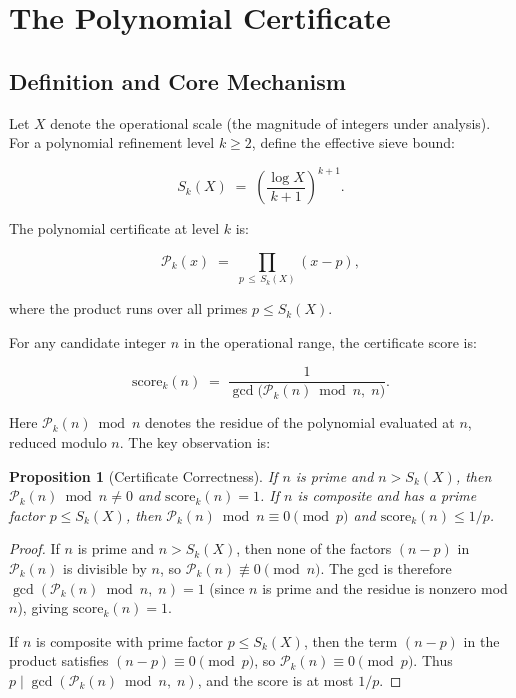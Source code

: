 \documentclass[11pt]{article}
\newtheorem{proposition}{Proposition}
\begin{document}
\section{The Polynomial Certificate}
\label{sec:score}

\subsection{Definition and Core Mechanism}

Let $X$ denote the operational scale (the magnitude of integers under analysis).
For a polynomial refinement level $k \ge 2$, define the effective sieve bound:

\begin{equation}
S_k(X) \;=\; \left(\frac{\log X}{k+1}\right)^{\!k+1}.
\end{equation}

\noindent The polynomial certificate at level $k$ is:

\begin{equation}
\mathcal{P}_k(x) \;=\; \prod_{p \,\le\, S_k(X)} (x - p),
\end{equation}

\noindent where the product runs over all primes $p \le S_k(X)$.

For any candidate integer $n$ in the operational range, the certificate score is:

\begin{equation}
\mathrm{score}_k(n) \;=\; \frac{1}{\gcd\!\bigl(\mathcal{P}_k(n)\bmod n,\; n\bigr)}.
\label{eq:score}
\end{equation}

\noindent Here $\mathcal{P}_k(n)\bmod n$ denotes the residue of the polynomial
evaluated at $n$, reduced modulo $n$. The key observation is:

\begin{proposition}[Certificate Correctness]
\label{prop:correctness}
If $n$ is prime and $n > S_k(X)$, then $\mathcal{P}_k(n)\bmod n \neq 0$ and
$\mathrm{score}_k(n) = 1$. If $n$ is composite and has a prime factor
$p \le S_k(X)$, then $\mathcal{P}_k(n)\bmod n \equiv 0 \pmod p$ and
$\mathrm{score}_k(n) \le 1/p$.
\end{proposition}

\begin{proof}
If $n$ is prime and $n > S_k(X)$, then none of the factors $(n-p)$ in
$\mathcal{P}_k(n)$ is divisible by $n$, so $\mathcal{P}_k(n)\not\equiv 0\pmod n$.
The gcd is therefore $\gcd(\mathcal{P}_k(n)\bmod n,\; n) = 1$ (since $n$ is
prime and the residue is nonzero mod $n$), giving $\mathrm{score}_k(n) = 1$.

If $n$ is composite with prime factor $p \le S_k(X)$, then the term $(n-p)$
in the product satisfies $(n-p)\equiv 0\pmod p$, so $\mathcal{P}_k(n)\equiv 0\pmod p$.
Thus $p \mid \gcd(\mathcal{P}_k(n)\bmod n,\; n)$, and the score is at most $1/p$.
\end{proof}
\end{document}
